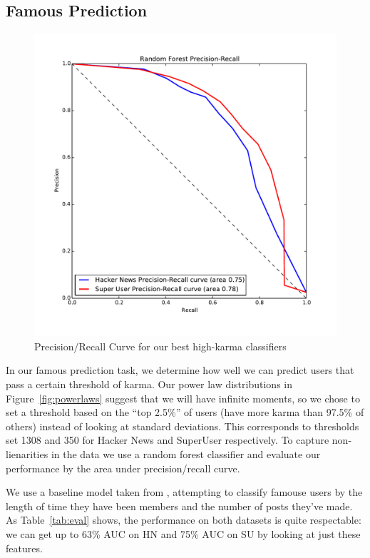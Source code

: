 \documentclass[11pt]{article}
\begin{document}
\subsection{Famous Prediction}
\label{sec:classification}

\begin{figure}[h]
\centering
\includegraphics[width=\linewidth]{classification_pr_curve}
\caption{Precision/Recall Curve for our best high-karma classifiers}
\label{fig:classification}
\end{figure}

In our famous prediction task, we determine how well we can predict users that
pass a certain threshold of karma. Our power law distributions 
in Figure~\ref{fig:powerlaws} suggest that we will have infinite moments, so we
chose to set a threshold based on the ``top 2.5\%'' of users 
(have more karma than 97.5\% of others) instead of looking at standard
deviations. This corresponds to thresholds set 1308 and 350 for 
Hacker News and SuperUser respectively. 
To capture non-lienarities in the data we use a random forest classifier and
evaluate our performance by the area under precision/recall curve.

We use a baseline model taken from \citet{movshovitzanalysis}, attempting to
classify famouse users by the length of time they have been members and the number
of posts they've made. As Table~\ref{tab:eval} shows, the performance on both
datasets is quite respectable: we can get up to 63\% AUC on HN and 75\% AUC on
SU by looking at just these features.
\end{document}
